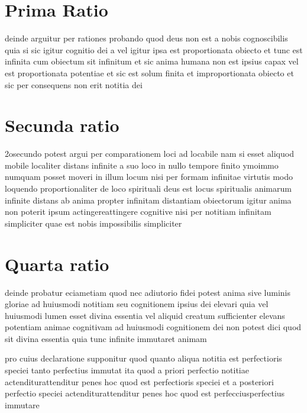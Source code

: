\documentclass[twoside, openright]{report}
\begin{document}
        \bigskip
         \section*{Prima Ratio} 
        \pstart
        deinde arguitur per rationes probando quod deus non est a nobis cognoscibilis quia si sic igitur cognitio dei a vel igitur ipsa est proportionata obiecto et tunc est infinita cum obiectum sit infinitum et sic anima humana non est ipsius capax vel est proportionata potentiae et sic est solum finita et improportionata obiecto et sic per consequens non erit notitia dei
        \pend
      
        \bigskip
         \section*{Secunda ratio} 
        \pstart
        2osecundo potest argui per comparationem loci ad locabile nam si esset aliquod mobile localiter distans infinite a suo loco in nullo tempore finito ymoimmo numquam posset moveri in illum locum nisi per formam infinitae virtutis modo loquendo proportionaliter de loco spirituali deus est locus spiritualis animarum infinite distans ab anima propter infinitam distantiam obiectorum igitur anima non poterit ipsum actingereattingere cognitive nisi per notitiam infinitam simpliciter quae est nobis impossibilis simpliciter
        \pend
      
        \bigskip
         \section*{Quarta ratio} 
        \pstart
        deinde probatur eciametiam quod nec adiutorio fidei potest anima sive luminis gloriae ad huiusmodi notitiam seu cognitionem ipsius dei elevari quia vel huiusmodi lumen esset divina essentia vel aliquid creatum sufficienter elevans potentiam animae cognitivam ad huiusmodi cognitionem dei non potest dici quod sit divina essentia quia tunc infinite immutaret animam
        \pend
     
        \pstart
        pro cuius declaratione supponitur quod quanto aliqua notitia est perfectioris speciei tanto perfectius immutat ita quod a priori perfectio notitiae actenditurattenditur penes hoc quod est perfectioris speciei et a posteriori perfectio speciei actenditurattenditur penes hoc quod est perfecciusperfectius immutare
        \pend
     
\end{document}
